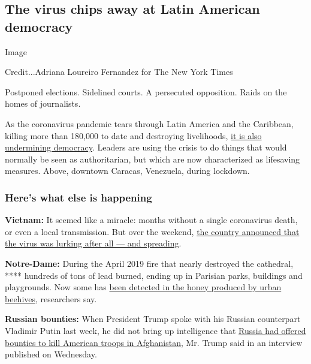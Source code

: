 \hypertarget{the-virus-chips-away-at-latin-american-democracy}{%
\subsection{The virus chips away at Latin American
democracy}\label{the-virus-chips-away-at-latin-american-democracy}}

Image

Credit...Adriana Loureiro Fernandez for The New York Times

Postponed elections. Sidelined courts. A persecuted opposition. Raids on
the homes of journalists.

As the coronavirus pandemic tears through Latin America and the
Caribbean, killing more than 180,000 to date and destroying livelihoods,
\href{https://www.nytimes.com/2020/07/29/world/americas/latin-america-democracy-pandemic.html}{it
is also undermining democracy}. Leaders are using the crisis to do
things that would normally be seen as authoritarian, but which are now
characterized as lifesaving measures. Above, downtown Caracas,
Venezuela, during lockdown.

\hypertarget{heres-what-else-is-happening}{%
\subsubsection{Here's what else is
happening}\label{heres-what-else-is-happening}}

\textbf{Vietnam:} It seemed like a miracle: months without a single
coronavirus death, or even a local transmission. But over the weekend,
\href{https://www.nytimes.com/2020/07/29/world/asia/coronavirus-vietnam.html}{the
country announced that the virus was lurking after all --- and
spreading}.

\textbf{Notre-Dame:} During the April 2019 fire that nearly destroyed
the cathedral, **** hundreds of tons of lead burned, ending up in
Parisian parks, buildings and playgrounds. Now some has
\href{https://www.nytimes.com/2020/07/29/world/europe/honey-lead-notredame-fire-paris.html}{been
detected in the honey produced by urban beehives}, researchers say.

\textbf{Russian bounties:} When President Trump spoke with his Russian
counterpart Vladimir Putin last week, he did not bring up intelligence
that
\href{https://www.nytimes.com/2020/06/26/us/politics/russia-afghanistan-bounties.html}{Russia
had offered bounties to kill American troops in Afghanistan}, Mr. Trump
said in an interview published on Wednesday.

